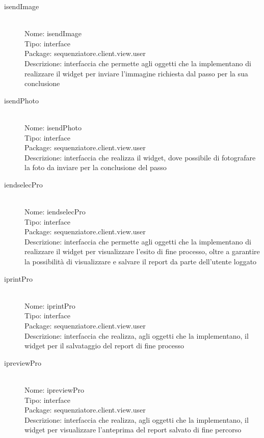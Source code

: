 \begin{description}
	\item[isendImage] 
  	\hfill \\
  	Nome: isendImage\\
  	Tipo: interface\\
	Package: sequenziatore.client.view.user\\
	Descrizione: interfaccia che permette agli oggetti che la implementano di realizzare il widget per inviare l'immagine richiesta dal passo per la sua conclusione
\end{description}

\begin{description}
	\item[isendPhoto] 
  	\hfill \\
  	Nome: isendPhoto\\
  	Tipo: interface\\
	Package: sequenziatore.client.view.user\\
	Descrizione: interfaccia che realizza il widget, dove possibile di fotografare la foto da inviare per la conclusione del passo
\end{description}

\begin{description}
	\item[iendselecPro] 
  	\hfill \\
  	Nome: iendselecPro\\
  	Tipo: interface\\
	Package: sequenziatore.client.view.user\\
	Descrizione: interfaccia che permette agli oggetti che la implementano di realizzare il widget per visualizzare l'esito di fine processo, oltre a garantire la possibilità di visualizzare e salvare il report da parte dell'utente loggato
\end{description}

\begin{description}
	\item[iprintPro] 
  	\hfill \\
  	Nome: iprintPro\\
  	Tipo: interface\\
	Package: sequenziatore.client.view.user\\
	Descrizione: interfaccia che realizza, agli oggetti che la implementano,  il widget per il salvataggio del report di fine processo
\end{description}

\begin{description}
	\item[ipreviewPro] 
  	\hfill \\
  	Nome: ipreviewPro\\
  	Tipo: interface\\
	Package: sequenziatore.client.view.user\\
	Descrizione: interfaccia che realizza, agli oggetti che la implementano,  il widget per visualizzare l'anteprima del report salvato di fine percorso
\end{description}

